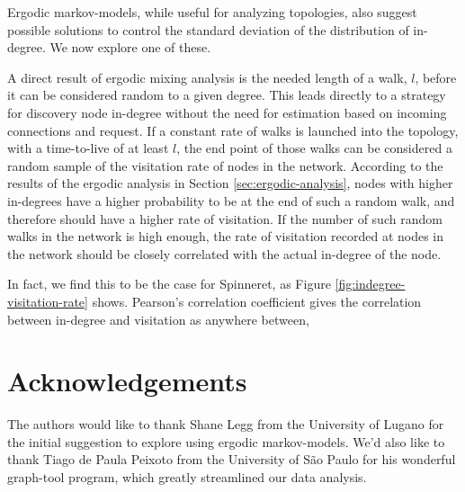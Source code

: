 \documentclass[a4paper,11pt,twocolumn]{article}
\begin{document}
Ergodic markov-models, while useful for analyzing topologies, also suggest
possible solutions to control the standard deviation of the distribution of
in-degree.  We now explore one of these.

A direct result of ergodic mixing analysis is the needed length of a walk, $l$,
before it can be considered random to a given degree.  This leads directly to a
strategy for discovery node in-degree without the need for estimation based on
incoming connections and request.  If a constant rate of walks is launched into
the topology, with a time-to-live of at least $l$, the end point of those walks
can be considered a random sample of the visitation rate of nodes in the
network.  According to the results of the ergodic analysis in Section
\ref{sec:ergodic-analysis}, nodes with higher in-degrees have a higher
probability to be at the end of such a random walk, and therefore should have a
higher rate of visitation.  If the number of such random walks in the network
is high enough, the rate of visitation recorded at nodes in the network should
be closely correlated with the actual in-degree of the node.

In fact, we find this to be the case for Spinneret, as Figure
\ref{fig:indegree-visitation-rate} shows.  Pearson's correlation coefficient
gives the correlation between in-degree and visitation as anywhere between, 


\section*{Acknowledgements}
The authors would like to thank Shane Legg from the University of Lugano for
the initial suggestion to explore using ergodic markov-models.  We'd also like
to thank Tiago de Paula Peixoto from the University of S\~ao Paulo for his
wonderful graph-tool program, which greatly streamlined our data analysis.

%
%
\end{document}

